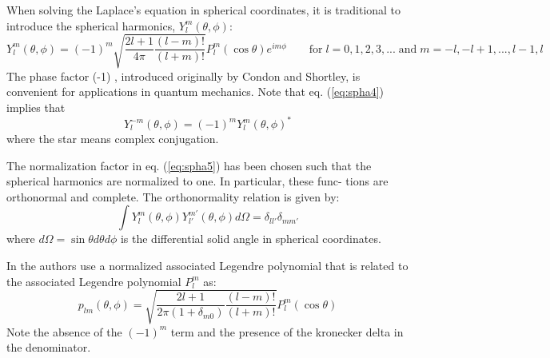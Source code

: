 When solving the Laplace’s equation in spherical coordinates, it is traditional
to introduce the spherical harmonics, $Y_l^m(\theta,\phi)$:
\begin{equation}
Y_l^m(\theta,\phi) = (-1)^m \sqrt{\frac{2l+1}{4\pi} \frac{(l-m)!}{(l+m)!}} P_l^m(\cos\theta) e^{im\phi}
\qquad 
\textrm{for} \; l=0,1,2,3,... \; \textrm{and} \; m=-l,-l+1,...,l-1,l
\label{eq:spha5}
\end{equation}
The phase factor (-1) , introduced originally by Condon and Shortley, is convenient for
applications in quantum mechanics. Note that eq. (\ref{eq:spha4}) implies that
\[
Y_l^{-m} (\theta, \phi) = (-1)^m Y_l^m (\theta,\phi)^* 
\]
where the star means complex conjugation.

The normalization factor in eq. (\ref{eq:spha5}) has been
chosen such that the spherical harmonics are normalized to one. In particular, these func-
tions are orthonormal and complete. The orthonormality relation is given by:
\[
\int Y_l^m(\theta,\phi) Y_{l'}^{m'}(\theta,\phi) d\Omega = \delta_{ll'} \delta_{mm'}
\]
where $d\Omega = \sin\theta d\theta d\phi$ is the differential solid angle in spherical coordinates.



\begin{remark}
In \cite{zhmt08} the authors use a normalized associated Legendre
polynomial that is related to the associated Legendre polynomial $P_l^m$ as:
\[
p_{lm}(\theta,\phi) = \sqrt{\frac{2l+1}{2\pi(1+\delta_{m0})} \frac{(l-m)!}{(l+m)!}} P_l^m(\cos\theta)
\]
Note the absence of the $(-1)^m$ term and the presence of the kronecker delta in the denominator.
\end{remark}


\Literature \cite{crms06}
